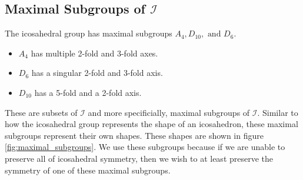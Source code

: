 \documentclass[a4paper,10pt]{article}
\theoremstyle{plain}
\theoremstyle{definition}
\theoremstyle{remark}
\begin{document}
\subsection{Maximal Subgroups of \(\mathcal{I}\)}
The icosahedral group has maximal subgroups \(A_4, D_{10}, \text{ and } D_6\).
\begin{itemize}
    \item \(A_4\) has multiple 2-fold and 3-fold axes.
    \item \(D_{6}\) has a singular 2-fold and 3-fold axis.
    \item \(D_{10}\) has a 5-fold and a 2-fold axis.
\end{itemize}
These are subsets of \(\mathcal{I}\) and more specificially, maximal subgroups of \(\mathcal{I}\).
Similar to how the icosahedral group represents the shape of an icosahedron, these maximal subgroups represent their own shapes.
These shapes are shown in figure \ref{fig:maximal_subgroups}.
We use these subgroups because if we are unable to preserve all of icosahedral symmetry, then we wish to at least preserve the symmetry of one of these maximal subgroups.
\end{document}

